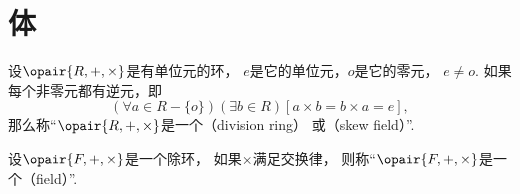 \section{体}
\begin{definition}
设\(\opair{R,+,\times}\)是有单位元的环，
\(e\)是它的单位元，\(o\)是它的零元，
\(e \neq o\).
如果每个非零元都有逆元，即\[
	(\forall a \in R-\{o\})(\exists b \in R)[a \times b = b \times a = e],
\]
那么称“\(\opair{R,+,\times}\)是一个（division ring）
或（skew field）”.
\end{definition}

\begin{definition}
设\(\opair{F,+,\times}\)是一个除环，
如果\(\times\)满足交换律，
则称“\(\opair{F,+,\times}\)是一个（field）”.
\end{definition}

